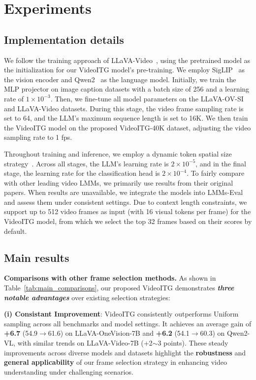 
\section{Experiments}




\subsection{Implementation details}
We follow the training approach of LLaVA-Video~\cite{zhang2024video}, using the pretrained model as the initialization for our VideoITG model's pre-training. We employ SigLIP~\cite{zhai2023sigmoid} as the vision encoder and Qwen2~\cite{wang2024qwen2} as the language model. Initially, we train the MLP projector on image caption datasets with a batch size of 256 and a learning rate of \(1 \times 10^{-3}\). Then, we fine-tune all model parameters on the LLaVA-OV-SI~\cite{li2024llavaonevision} and LLaVA-Video datasets. During this stage, the video frame sampling rate is set to 64, and the LLM's maximum sequence length is set to 16K. We then train the VideoITG model on the proposed VideoITG-40K dataset, adjusting the video sampling rate to 1 fps. 

Throughout training and inference, we employ a dynamic token spatial size strategy~\cite{liu2025oryx}. Across all stages, the LLM's learning rate is \(2 \times 10^{-5}\), and in the final stage, the learning rate for the classification head is \(2 \times 10^{-4}\). To fairly compare with other leading video LMMs, we primarily use results from their original papers. When results are unavailable, we integrate the models into LMMs-Eval~\cite{zhang2024lmms} and assess them under consistent settings. Due to context length constraints, we support up to 512 video frames as input (with 16 visual tokens per frame) for the VideoITG model, from which we select the top 32 frames based on their scores by default. 

\subsection{Main results}



\noindent \textbf{Comparisons with other frame selection methods.}
As shown in Table~\ref{tab:main_comparisons}, our proposed VideoITG demonstrates \textbf{\textit{three notable advantages}} over existing selection strategies: 

\textbf{(i) Consistant Improvement}: VideoITG consistently outperforms Uniform sampling across all benchmarks and model settings. It achieves an average gain of \textbf{+6.7} (54.9$\rightarrow$61.6) on LLaVA-OneVision-7B and \textbf{+6.2} (54.1$\rightarrow$60.3) on Qwen2-VL, with similar trends on LLaVA-Video-7B (+2$\sim$3 points). These steady improvements across diverse models and datasets highlight the \textbf{robustness} and \textbf{general applicability} of our frame selection strategy in enhancing video understanding under challenging scenarios.

